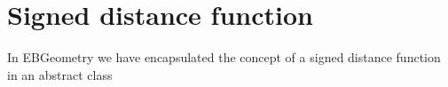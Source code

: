 \documentclass[letterpaper,10pt,english]{sphinxmanual}
\begin{document}
\begin{sphinxVerbatim}[commandchars=\\\{\}]

\end{sphinxVerbatim}

\sphinxstepscope


\section{Signed distance function}
\label{\detokenize{ImplemSDF:signed-distance-function}}\label{\detokenize{ImplemSDF:chap-implemsdf}}\label{\detokenize{ImplemSDF::doc}}
\sphinxAtStartPar
In EBGeometry we have encapsulated the concept of a signed distance function in an abstract class
\end{document}
